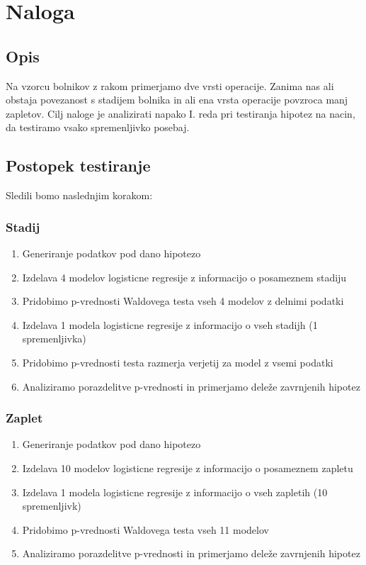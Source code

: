\documentclass[letterpaper,11pt]{article}
\begin{document}
\section{Naloga}
\subsection{Opis}
Na vzorcu bolnikov z rakom primerjamo dve vrsti operacije. Zanima nas ali obstaja povezanost s stadijem bolnika in ali ena vrsta operacije povzroca manj zapletov. Cilj naloge je analizirati napako I. reda pri testiranja hipotez na nacin, da testiramo vsako spremenljivko posebaj. 

\subsection{Postopek testiranje}
Sledili bomo naslednjim korakom:

\subsubsection{Stadij}
\begin{enumerate}
  \item Generiranje podatkov pod dano hipotezo
  \item Izdelava 4 modelov logisticne regresije z informacijo o posameznem stadiju
  \item Pridobimo p-vrednosti Waldovega testa vseh 4 modelov z delnimi podatki
  \item Izdelava 1 modela logisticne regresije z informacijo o vseh stadijh (1 spremenljivka)
  \item Pridobimo p-vrednosti testa razmerja verjetij za model z vsemi podatki
  \item Analiziramo porazdelitve p-vrednosti in primerjamo deleže zavrnjenih hipotez
\end{enumerate}

\subsubsection{Zaplet}
\begin{enumerate}
  \item Generiranje podatkov pod dano hipotezo
  \item Izdelava 10 modelov logisticne regresije z informacijo o posameznem zapletu
  \item Izdelava 1 modela logisticne regresije z informacijo o vseh zapletih (10 spremenljivk)
  \item Pridobimo p-vrednosti Waldovega testa vseh 11 modelov
  \item Analiziramo porazdelitve p-vrednosti in primerjamo deleže zavrnjenih hipotez
\end{enumerate}
\end{document}
